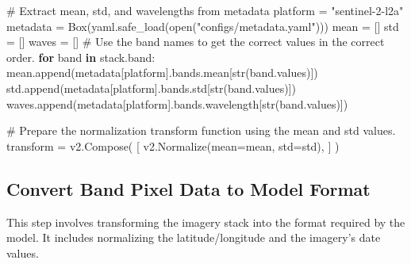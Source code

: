 \documentclass[
  letterpaper,
  DIV=11,
  numbers=noendperiod]{scrreprt}
\newenvironment{Shaded}{\begin{snugshade}}{\end{snugshade}}
\newcommand{\BuiltInTok}[1]{\textcolor[rgb]{0.00,0.23,0.31}{#1}}
\newcommand{\CommentTok}[1]{\textcolor[rgb]{0.37,0.37,0.37}{#1}}
\newcommand{\ControlFlowTok}[1]{\textcolor[rgb]{0.00,0.23,0.31}{\textbf{#1}}}
\newcommand{\KeywordTok}[1]{\textcolor[rgb]{0.00,0.23,0.31}{\textbf{#1}}}
\newcommand{\NormalTok}[1]{\textcolor[rgb]{0.00,0.23,0.31}{#1}}
\newcommand{\OperatorTok}[1]{\textcolor[rgb]{0.37,0.37,0.37}{#1}}
\newcommand{\StringTok}[1]{\textcolor[rgb]{0.13,0.47,0.30}{#1}}
\begin{document}
\begin{Shaded}
\begin{Highlighting}[]
\CommentTok{\# Extract mean, std, and wavelengths from metadata}
\NormalTok{platform }\OperatorTok{=} \StringTok{"sentinel{-}2{-}l2a"}
\NormalTok{metadata }\OperatorTok{=}\NormalTok{ Box(yaml.safe\_load(}\BuiltInTok{open}\NormalTok{(}\StringTok{"configs/metadata.yaml"}\NormalTok{)))}
\NormalTok{mean }\OperatorTok{=}\NormalTok{ []}
\NormalTok{std }\OperatorTok{=}\NormalTok{ []}
\NormalTok{waves }\OperatorTok{=}\NormalTok{ []}
\CommentTok{\# Use the band names to get the correct values in the correct order.}
\ControlFlowTok{for}\NormalTok{ band }\KeywordTok{in}\NormalTok{ stack.band:}
\NormalTok{    mean.append(metadata[platform].bands.mean[}\BuiltInTok{str}\NormalTok{(band.values)])}
\NormalTok{    std.append(metadata[platform].bands.std[}\BuiltInTok{str}\NormalTok{(band.values)])}
\NormalTok{    waves.append(metadata[platform].bands.wavelength[}\BuiltInTok{str}\NormalTok{(band.values)])}

\CommentTok{\# Prepare the normalization transform function using the mean and std values.}
\NormalTok{transform }\OperatorTok{=}\NormalTok{ v2.Compose(}
\NormalTok{    [}
\NormalTok{        v2.Normalize(mean}\OperatorTok{=}\NormalTok{mean, std}\OperatorTok{=}\NormalTok{std),}
\NormalTok{    ]}
\NormalTok{)}
\end{Highlighting}
\end{Shaded}

\subsection{Convert Band Pixel Data to Model
Format}\label{convert-band-pixel-data-to-model-format}

This step involves transforming the imagery stack into the format
required by the model. It includes normalizing the latitude/longitude
and the imagery's date values.
\end{document}
